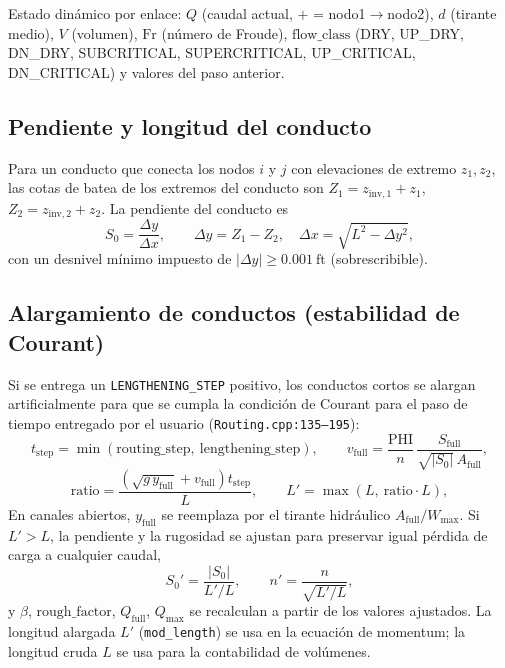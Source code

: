 \documentclass[11pt,a4paper]{article}
\newcommand{\ft}{\mathrm{ft}}
\begin{document}
Estado dinámico por enlace: $Q$ (caudal actual, $+$ = nodo1$\to$nodo2), $d$
(tirante medio), $V$ (volumen), $\mathrm{Fr}$ (número de Froude),
$\mathrm{flow\_class}$ (DRY, UP\_DRY, DN\_DRY, SUBCRITICAL, SUPERCRITICAL,
UP\_CRITICAL, DN\_CRITICAL) y valores del paso anterior.

\subsection{Pendiente y longitud del conducto}

Para un conducto que conecta los nodos $i$ y $j$ con elevaciones de extremo
$z_1, z_2$, las cotas de batea de los extremos del conducto son $Z_1 =
z_{\mathrm{inv},1} + z_1$, $Z_2 = z_{\mathrm{inv},2} + z_2$. La pendiente del
conducto es
\begin{equation}
  S_0 = \frac{\Delta y}{\Delta x},
  \qquad \Delta y = Z_1 - Z_2, \quad
  \Delta x = \sqrt{L^{2} - \Delta y^{2}},
\end{equation}
con un desnivel mínimo impuesto de $\lvert \Delta y \rvert \ge 0.001\ \ft$
(sobrescribible).

\subsection{Alargamiento de conductos (estabilidad de Courant)}

Si se entrega un \texttt{LENGTHENING\_STEP} positivo, los conductos cortos se
alargan artificialmente para que se cumpla la condición de Courant para el paso
de tiempo entregado por el usuario (\texttt{Routing.cpp:135--195}):
\begin{equation}
  t_{\mathrm{step}} = \min(\mathrm{routing\_step},\ \mathrm{lengthening\_step}),
  \qquad
  v_{\mathrm{full}} = \frac{\mathrm{PHI}}{n}\,\frac{S_{\mathrm{full}}}
    {\sqrt{|S_0|}\,A_{\mathrm{full}}},
\end{equation}
\begin{equation}
  \mathrm{ratio} = \frac{\left(\sqrt{g\,y_{\mathrm{full}}} + v_{\mathrm{full}}\right)
    t_{\mathrm{step}}}{L},
  \qquad
  L' = \max(L,\ \mathrm{ratio}\cdot L),
\end{equation}
En canales abiertos, $y_{\mathrm{full}}$ se reemplaza por el tirante hidráulico
$A_{\mathrm{full}}/W_{\max}$. Si $L' > L$, la pendiente y la rugosidad se
ajustan para preservar igual pérdida de carga a cualquier caudal,
\begin{equation}
  S_0' = \frac{|S_0|}{L'/L}, \qquad
  n' = \frac{n}{\sqrt{L'/L}},
\end{equation}
y $\beta$, $\mathrm{rough\_factor}$, $Q_{\mathrm{full}}$, $Q_{\max}$ se
recalculan a partir de los valores ajustados. La longitud alargada $L'$
(\texttt{mod\_length}) se usa en la ecuación de momentum; la longitud cruda $L$
se usa para la contabilidad de volúmenes.
\end{document}
